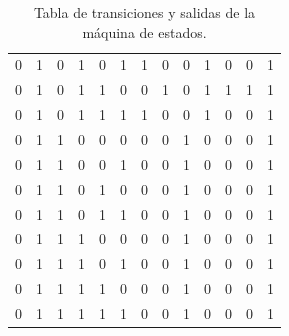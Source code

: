 \documentclass[12pt, letterpaper]{article}
\begin{document}
\begin{table}[H]
\begin{center}
\begin{tabular}{|ccc|ccc|ccc|cccc|}
    0 & 1 & 0 & 1 & 0 & 1 & 1 & 0 & 0 & \cellcolor{ForestGreen!90}1 & \cellcolor{ForestGreen!90}0 & \cellcolor{ForestGreen!90}0 & \cellcolor{ForestGreen!90}1 \\
    0 & 1 & 0 & 1 & 1 & 0 & 0 & 1 & 0 & \cellcolor{ForestGreen!90}1 & \cellcolor{ForestGreen!90}1 & \cellcolor{ForestGreen!90}1 & \cellcolor{ForestGreen!90}1 \\
    0 & 1 & 0 & 1 & 1 & 1 & 1 & 0 & 0 & \cellcolor{ForestGreen!90}1 & \cellcolor{ForestGreen!90}0 & \cellcolor{ForestGreen!90}0 & \cellcolor{ForestGreen!90}1 \\
    \hline
    0 & 1 & 1 & 0 & 0 & 0 & 0 & 0 & 1 & \cellcolor{ForestGreen!90}0 & \cellcolor{ForestGreen!90}0 & \cellcolor{ForestGreen!90}0 & \cellcolor{ForestGreen!90}1 \\
    0 & 1 & 1 & 0 & 0 & 1 & 0 & 0 & 1 & \cellcolor{ForestGreen!90}0 & \cellcolor{ForestGreen!90}0 & \cellcolor{ForestGreen!90}0 & \cellcolor{ForestGreen!90}1 \\
    0 & 1 & 1 & 0 & 1 & 0 & 0 & 0 & 1 & \cellcolor{ForestGreen!90}0 & \cellcolor{ForestGreen!90}0 & \cellcolor{ForestGreen!90}0 & \cellcolor{ForestGreen!90}1 \\
    0 & 1 & 1 & 0 & 1 & 1 & 0 & 0 & 1 & \cellcolor{ForestGreen!90}0 & \cellcolor{ForestGreen!90}0 & \cellcolor{ForestGreen!90}0 & \cellcolor{ForestGreen!90}1 \\
    0 & 1 & 1 & 1 & 0 & 0 & 0 & 0 & 1 & \cellcolor{ForestGreen!90}0 & \cellcolor{ForestGreen!90}0 & \cellcolor{ForestGreen!90}0 & \cellcolor{ForestGreen!90}1 \\
    0 & 1 & 1 & 1 & 0 & 1 & 0 & 0 & 1 & \cellcolor{ForestGreen!90}0 & \cellcolor{ForestGreen!90}0 & \cellcolor{ForestGreen!90}0 & \cellcolor{ForestGreen!90}1 \\
    0 & 1 & 1 & 1 & 1 & 0 & 0 & 0 & 1 & \cellcolor{ForestGreen!90}0 & \cellcolor{ForestGreen!90}0 & \cellcolor{ForestGreen!90}0 & \cellcolor{ForestGreen!90}1 \\
    0 & 1 & 1 & 1 & 1 & 1 & 0 & 0 & 1 & \cellcolor{ForestGreen!90}0 & \cellcolor{ForestGreen!90}0 & \cellcolor{ForestGreen!90}0 & \cellcolor{ForestGreen!90}1 \\
    \hline
    \end{tabular}
\end{center}
\caption{Tabla de transiciones y salidas de la máquina de estados.}
\label{tab:tabla_transiciones_estados_salidas_1}
\end{table}
\end{document}
